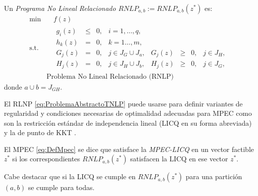 \begin{definition}

Un \textit{Programa No Lineal Relacionado $RNLP_{a,b} := RNLP_{a,b}(z^*)$} es:
\begin{equation}
\begin{aligned}
\min  &\quad  f(z)  \\
\text{s.t.} &\quad \begin{matrix} g_i(z)& \leq& 0, &i=1,\ldots,q, \\ h_k(z) &=& 0,&k=1\ldots,m, \\
 G_j(z) &=& 0, & j\in J_G\cup J_{a},& G_j(z) &\geq& 0, & j\in J_H,\\ 
H_j(z) &=& 0, & j\in J_H\cup J_{b},& H_j(z) &\geq& 0, & j\in J_G,\end{matrix}\\
& \text{Problema No Lineal Relacionado (RNLP)}  
\end{aligned}
\label{eq:ProblemaAbstractoTNLP}
\end{equation}
    donde $a\cup b=J_{GH}$.
\end{definition}

El RLNP \eqref{eq:ProblemaAbstractoTNLP} puede  usarse para definir variantes de regularidad y condiciones necesarias de optimalidad  adecuadas para MPEC como son la  restricción estándar de independencia lineal (LICQ en su forma abreviada) y la de punto de KKT .

\begin{definition}
El MPEC \eqref{eq:DefMpec} se dice que satisface la \textit{MPEC-LICQ}  en un vector factible $z^*$ si los correspondientes $RNLP_{a,b}(z^*)$ satisfacen la LICQ  en ese vector $z^*$.
\end{definition}
    Cabe destacar que si la LICQ se cumple en  $RNLP_{a,b}(z^*)$ para una partición $(a,b)$ se cumple para todas. 

